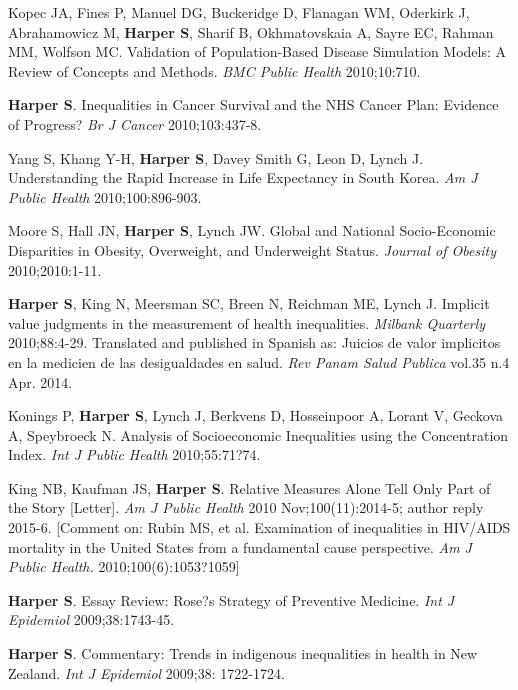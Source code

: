 \documentclass[
  letterpaper,
  DIV=11,
  numbers=noendperiod]{scrartcl}
\begin{document}
\begin{etaremune}
\item Kopec JA, Fines P, Manuel DG, Buckeridge D, Flanagan WM, Oderkirk J, Abrahamowicz M, \textbf{Harper S}, Sharif B, Okhmatovskaia A, Sayre EC, Rahman MM, Wolfson MC. Validation of Population-Based Disease Simulation Models: A Review of Concepts and Methods. \emph{BMC Public Health} 2010;10:710.
 
\item \textbf{Harper S}. Inequalities in Cancer Survival and the NHS Cancer Plan: Evidence of Progress? \emph{Br J Cancer} 2010;103:437-8.
 
\item Yang S, Khang Y-H, \textbf{Harper S}, Davey Smith G, Leon D, Lynch J.  Understanding the Rapid Increase in Life Expectancy in South Korea.  \emph{Am J Public Health} 2010;100:896-903.
 
\item Moore S, Hall JN, \textbf{Harper S}, Lynch JW. Global and National Socio-Economic Disparities in Obesity, Overweight, and Underweight Status. \emph{Journal of Obesity} 2010;2010:1-11.
 
\item \textbf{Harper S}, King N, Meersman SC, Breen N, Reichman ME, Lynch J. Implicit value judgments in the measurement of health inequalities.  \emph{Milbank Quarterly} 2010;88:4-29. Translated and published in Spanish as: Juicios de valor implicitos en la medicien de las desigualdades en salud. \emph{Rev Panam Salud Publica} vol.35 n.4 Apr. 2014. 
 
\item Konings P, \textbf{Harper S}, Lynch J, Berkvens D, Hosseinpoor A, Lorant V, Geckova A, Speybroeck N. Analysis of Socioeconomic Inequalities using the Concentration Index.  \emph{Int J Public Health} 2010;55:71?74.
 
\item King NB, Kaufman JS, \textbf{Harper S}. Relative Measures Alone Tell Only Part of the Story [Letter]. \emph{Am J Public Health} 2010 Nov;100(11):2014-5; author reply 2015-6. [Comment on: Rubin MS, et al. Examination of inequalities in HIV/AIDS mortality in the United States from a fundamental cause perspective. \emph{Am J Public Health.} 2010;100(6):1053?1059]

\item \textbf{Harper S}. Essay Review: Rose?s Strategy of Preventive Medicine.  \emph{Int J Epidemiol} 2009;38:1743-45.
 
\item \textbf{Harper S}. Commentary: Trends in indigenous inequalities in health in New Zealand.  \emph{Int J Epidemiol} 2009;38: 1722-1724.
 

\end{etaremune}
\end{document}
